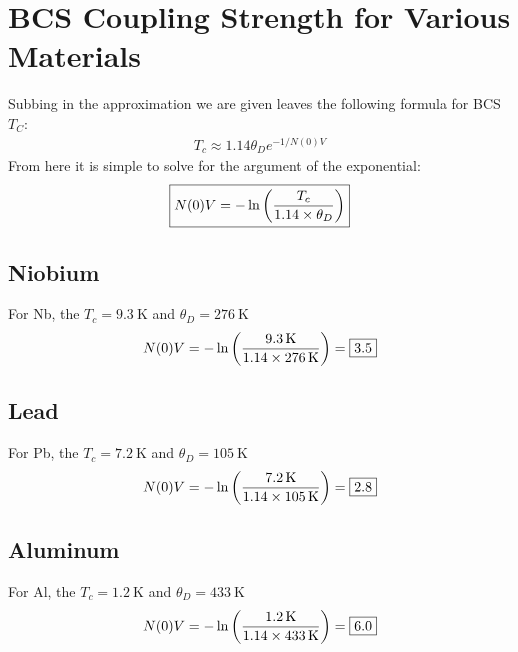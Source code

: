 \documentclass[12pt]{article}
\begin{document}
\section{BCS Coupling Strength for Various Materials}
Subbing in the approximation we are given leaves the following formula for BCS $T_C$:
\begin{align*}
  T_c\approx1.14\theta_De^{-1/N(0)V}
\end{align*}
From here it is simple to solve for the argument of the exponential:
\begin{align*}
  \boxed{N(0)V=-\ln\qty(\frac{T_c}{1.14\times\theta_D})}
\end{align*}
\subsection{Niobium}
For Nb, the $T_c=\SI{9.3}{\K}$ and $\theta_D=\SI{276}{\K}$
\begin{align*}
  N(0)V=-\ln\qty(\frac{\SI{9.3}{\K}}{1.14\times\SI{276}{\K}})=\boxed{3.5}
\end{align*}
\subsection{Lead}
For Pb, the $T_c=\SI{7.2}{\K}$ and $\theta_D=\SI{105}{\K}$
\begin{align*}
  N(0)V=-\ln\qty(\frac{\SI{7.2}{\K}}{1.14\times\SI{105}{\K}})=\boxed{2.8}
\end{align*}
\subsection{Aluminum}
For Al, the $T_c=\SI{1.2}{\K}$ and $\theta_D=\SI{433}{\K}$
\begin{align*}
  N(0)V=-\ln\qty(\frac{\SI{1.2}{\K}}{1.14\times\SI{433}{\K}})=\boxed{6.0}
\end{align*}
\end{document}
